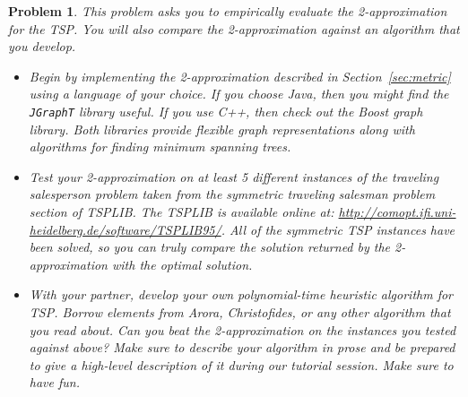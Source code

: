 \documentclass[11pt]{article}
\newtheorem{problem}{Problem}
\begin{document}
\begin{problem}
This problem asks you to empirically evaluate the 2-approximation for the TSP.  You will also compare the 2-approximation against an algorithm that you develop.
\begin{itemize}
	\item Begin by implementing the 2-approximation described in Section~\ref{sec:metric} using a language of your choice.  If you choose Java, then you might find the {\tt JGraphT} library useful.  If you use C++, then check out the Boost graph library.  Both libraries provide flexible graph representations along with algorithms for finding minimum spanning trees.
	\item Test your 2-approximation on at least 5 different instances of the traveling salesperson problem taken from the {\em symmetric traveling salesman problem} section of TSPLIB.  The TSPLIB is available online at: \url{http://comopt.ifi.uni-heidelberg.de/software/TSPLIB95/}.  All of the symmetric TSP instances have been solved, so you can truly compare the solution returned by the 2-approximation with the optimal solution.
	\item With your partner, develop your own polynomial-time heuristic algorithm for TSP.  Borrow elements from Arora, Christofides, or any other algorithm that you read about.  Can you beat the 2-approximation on the instances you tested against above?  Make sure to describe your algorithm in prose and be prepared to give a high-level description of it during our tutorial session.  Make sure to have fun.
\end{itemize}
\end{problem}
\end{document}
